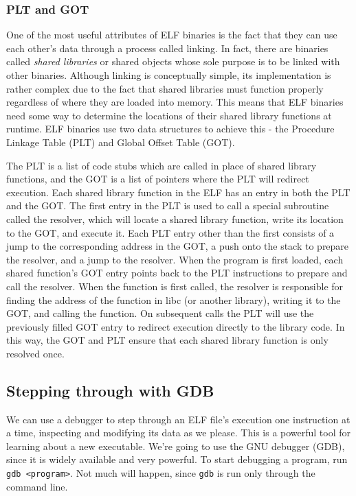 \documentclass{article}
\begin{document}
\subsubsection{PLT and GOT}
One of the most useful attributes of ELF binaries is the fact that they can use
each other's data through a process called linking. In fact, there are binaries
called \emph{shared libraries} or shared objects whose sole purpose is to be
linked with other binaries. Although linking is conceptually simple, its
implementation is rather complex due to the fact that shared libraries must
function properly regardless of where they are loaded into memory. This means
that ELF binaries need some way to determine the locations of their shared
library functions at runtime. ELF binaries use two data structures to achieve
this - the Procedure Linkage Table (PLT) and Global Offset Table (GOT).

The PLT is a list of code stubs which are called in place of shared library
functions, and the GOT is a list of pointers where the PLT will redirect
execution. Each shared library function in the ELF has an entry in both the PLT
and the GOT. The first entry in the PLT is used to call a special subroutine
called the resolver, which will locate a shared library function, write its
location to the GOT, and execute it. Each PLT entry other than the first
consists of a jump to the corresponding address in the GOT, a push onto the
stack to prepare the resolver, and a jump to the resolver. When the program is
first loaded, each shared function's GOT entry points back to the PLT
instructions to prepare and call the resolver. When the function is first
called, the resolver is responsible for finding the address of the function in
libc (or another library), writing it to the GOT, and calling the function.  On
subsequent calls the PLT will use the previously filled GOT entry to redirect
execution directly to the library code. In this way, the GOT and PLT ensure that
each shared library function is only resolved once.

\subsection{Stepping through with GDB}
We can use a debugger to step through an ELF file's execution one instruction at
a time, inspecting and modifying its data as we please. This is a powerful tool
for learning about a new executable. We're going to use the GNU debugger (GDB),
since it is widely available and very powerful. To start debugging a program,
run \texttt{gdb <program>}. Not much will happen, since \texttt{gdb} is run only
through the command line.
\end{document}
